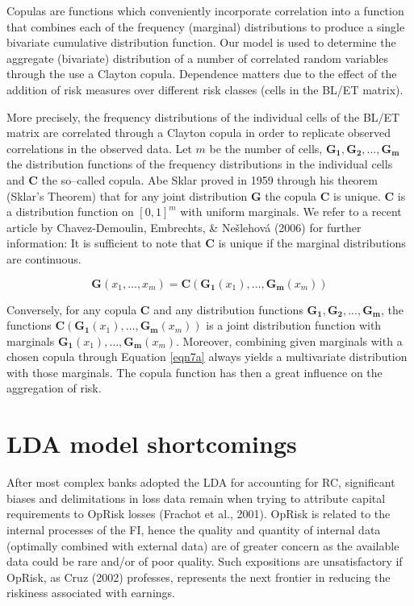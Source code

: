\documentclass{DissertateUSU}
\begin{document}
Copulas are functions which conveniently incorporate correlation into a
function that combines each of the frequency (marginal) distributions to
produce a single bivariate cumulative distribution function. Our model
is used to determine the aggregate (bivariate) distribution of a number
of correlated random variables through the use a Clayton copula.
Dependence matters due to the effect of the addition of risk measures
over different risk classes (cells in the BL/ET matrix). \medskip

More precisely, the frequency distributions of the individual cells of
the BL/ET matrix are correlated through a Clayton copula in order to
replicate observed correlations in the observed data. Let \(m\) be the
number of cells, \(\mathbf{G_1}, \mathbf{G_2},...,\mathbf{G_m}\) the
distribution functions of the frequency distributions in the individual
cells and \(\mathbf{C}\) the so--called copula. Abe Sklar proved in 1959
through his theorem (Sklar's Theorem) that for any joint distribution
\(\mathbf{G}\) the copula \(\mathbf{C}\) is unique. \(\mathbf{C}\) is a
distribution function on \([0,1]^{m}\) with uniform marginals. We refer
to a recent article by Chavez-Demoulin, Embrechts, \& Nešlehová (2006)
for further information: It is sufficient to note that \(\mathbf{C}\) is
unique if the marginal distributions are continuous.

\singlespacing

\begin{equation}\label{eqn7a}
\mathbf{G}(x_1, \ldots, x_m) = \mathbf{C}\left(\mathbf{G_1}(x_1), \ldots, \mathbf{G_m}(x_m) \right)
\end{equation} \doublespacing

Conversely, for any copula \(\mathbf{C}\) and any distribution functions
\(\mathbf{G_1}, \mathbf{G_2},...,\mathbf{G_m}\), the functions
\(\mathbf{C}\left(\mathbf{G_1}(x_1), \ldots, \mathbf{G_m}(x_m) \right)\)
is a joint distribution function with marginals
\(\mathbf{G_1}(x_1), \ldots, \mathbf{G_m}(x_m)\). Moreover, combining
given marginals with a chosen copula through Equation \ref{eqn7a} always
yields a multivariate distribution with those marginals. The copula
function has then a great influence on the aggregation of risk.

\section{LDA model shortcomings}
\label{ssec:LDA model shortcomings}

After most complex banks adopted the LDA for accounting for RC,
significant biases and delimitations in loss data remain when trying to
attribute capital requirements to OpRisk losses (Frachot et al., 2001).
OpRisk is related to the internal processes of the FI, hence the quality
and quantity of internal data (optimally combined with external data)
are of greater concern as the available data could be rare and/or of
poor quality. Such expositions are unsatisfactory if OpRisk, as Cruz
(2002) professes, represents the next frontier in reducing the riskiness
associated with earnings.
\end{document}

